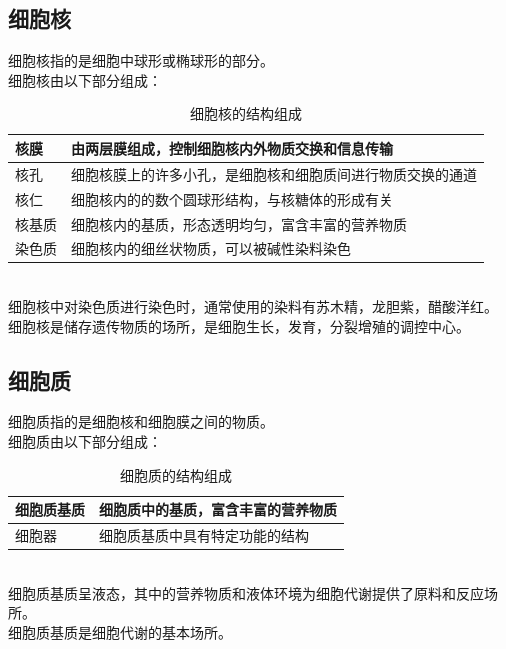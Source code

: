 \documentclass[UTF8]{ctexart}
\begin{document}
\subsection{细胞核}
    细胞核指的是细胞中球形或椭球形的部分。\\[3mm]
    细胞核由以下部分组成：\vspace{5pt}
    \begin{table}[h]
        \begin{center}
            \begin{tabular}{l|l}
                \hline
                核膜\qquad\qquad&由两层膜组成，控制细胞核内外物质交换和信息传输\qquad\qquad\\ \hline
                核孔\qquad\qquad&细胞核膜上的许多小孔，是细胞核和细胞质间进行物质交换的通道\qquad\qquad\\ \hline
                核仁\qquad\qquad&细胞核内的的数个圆球形结构，与核糖体的形成有关\qquad\qquad\\ \hline
                核基质\qquad\qquad&细胞核内的基质，形态透明均匀，富含丰富的营养物质\qquad\qquad\\ \hline
                染色质\qquad\qquad&细胞核内的细丝状物质，可以被碱性染料染色\qquad\qquad\\ \hline
            \end{tabular}
            \caption{细胞核的结构组成}
        \end{center}
    \end{table}\\
    细胞核中对染色质进行染色时，通常使用的染料有苏木精，龙胆紫，醋酸洋红。\\[3mm]
    细胞核是储存遗传物质的场所，是细胞生长，发育，分裂增殖的调控中心。\\
    
\subsection{细胞质}
    细胞质指的是细胞核和细胞膜之间的物质。\\[3mm]
    细胞质由以下部分组成：\vspace{5pt}
    \begin{table}[h]
        \begin{center}
            \begin{tabular}{l|l}
                \hline
                细胞质基质\qquad\qquad&细胞质中的基质，富含丰富的营养物质\qquad\qquad\\ \hline
                细胞器\qquad\qquad&细胞质基质中具有特定功能的结构\qquad\qquad\\ \hline
            \end{tabular}
            \caption{细胞质的结构组成}
        \end{center}
    \end{table}\\
    细胞质基质呈液态，其中的营养物质和液体环境为细胞代谢提供了原料和反应场所。\\[3mm]
    细胞质基质是细胞代谢的基本场所。
\end{document}
